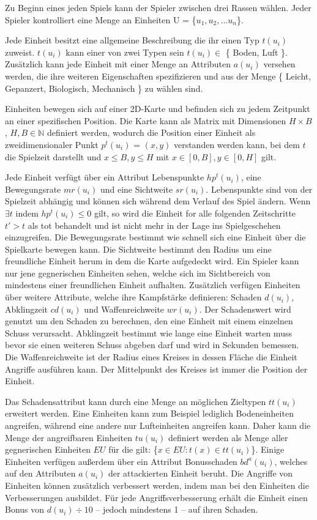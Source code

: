 Zu Beginn eines jeden Spiels kann der Spieler zwischen drei Rassen wählen. Jeder Spieler kontrolliert eine Menge an Einheiten U = \{$u_1, u_2, ... u_n$\}. 

Jede Einheit besitzt eine allgemeine Beschreibung die ihr einen Typ $t(u_i)$ zuweist. $t(u_i)$ kann einer von zwei Typen sein $t(u_i) \in$ \{ Boden, Luft \}. Zusätzlich kann jede Einheit mit einer Menge an Attributen $a(u_i)$ versehen werden, die ihre weiteren Eigenschaften spezifizieren und aus der Menge \{ Leicht, Gepanzert, Biologisch, Mechanisch \} zu wählen sind.

Einheiten bewegen sich auf einer 2D-Karte und befinden sich zu jedem Zeitpunkt an einer spezifischen Position. Die Karte kann als Matrix mit Dimensionen $H \times B$, $H,B \in \mathbb{N}$ definiert werden, wodurch die Position einer Einheit als zweidimensionaler Punkt $p^t(u_i)$ = $(x,y)$ verstanden werden kann, bei dem $t$ die Spielzeit darstellt und $x \leq B, y \leq H$ mit $x \in [0,B], y \in [0,H]$ gilt.

Jede Einheit verfügt über ein Attribut Lebenspunkte $hp^t(u_i)$, eine Bewegungsrate $mr(u_i)$ und eine Sichtweite $sr(u_i)$. Lebenspunkte sind von der Spielzeit abhängig und können sich während dem Verlauf des Spiel ändern. Wenn $\exists t$ indem $hp^t(u_i) \leq 0$ gilt, so wird die Einheit for alle folgenden Zeitschritte $t' > t$ als tot behandelt und ist nicht mehr in der Lage ins Spielgeschehen einzugreifen. Die Bewegungsrate bestimmt wie schnell sich eine Einheit über die Spielkarte bewegen kann. Die Sichtweite bestimmt den Radius um eine freundliche Einheit herum in dem die Karte aufgedeckt wird. Ein Spieler kann nur jene gegnerischen Einheiten sehen, welche sich im Sichtbereich von mindestens einer freundlichen Einheit aufhalten. Zusätzlich verfügen Einheiten über weitere Attribute, welche ihre Kampfstärke definieren: Schaden $d(u_i)$, Abklingzeit $cd(u_i)$ und Waffenreichweite $wr(u_i)$. Der Schadenswert wird genutzt um den Schaden zu berechnen, den eine Einheit mit einem einzelnen Schuss verursacht. Abklingzeit bestimmt wie lange eine Einheit warten muss bevor sie einen weiteren Schuss abgeben darf und wird in Sekunden bemessen. Die Waffenreichweite ist der Radius eines Kreises in dessen Fläche die Einheit Angriffe ausführen kann. Der Mittelpunkt des Kreises ist immer die Position der Einheit. 

Das Schadensattribut kann durch eine Menge an möglichen Zieltypen $tt(u_i)$ erweitert werden. Eine Einheiten kann zum Beispiel lediglich Bodeneinheiten angreifen, während eine andere nur Lufteinheiten angreifen kann. Daher kann die Menge der angreifbaren Einheiten $tu(u_i)$ definiert werden als Menge aller gegnerischen Einheiten $EU$ für die gilt: \{$x \in EU : t(x) \in tt(u_i)$\}. Einige Einheiten verfügen außerdem über ein Attribut Bonusschaden $bd^{a}(u_i)$, welches auf den Attributen $a(u_i)$ der attackierten Einheit beruht. Die Angriffe von Einheiten können zusätzlich verbessert werden, indem man bei den Einheiten die Verbesserungen ausbildet. Für jede Angriffsverbesserung erhält die Einheit einen Bonus von $d(u_i) \div 10$ -- jedoch mindestens 1 -- auf ihren Schaden. 

